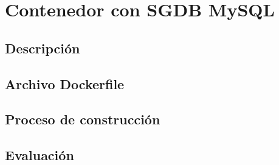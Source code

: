 \section{Contenedor con SGDB MySQL}

\subsection{Descripción}

\subsection{Archivo Dockerfile}

\subsection{Proceso de construcción}


\subsection{Evaluación}